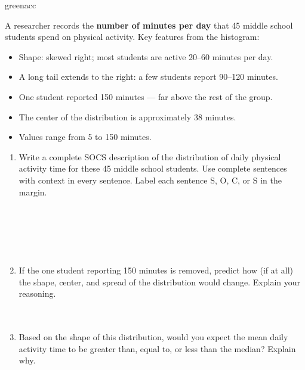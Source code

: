\documentclass[10pt]{article}
\begin{document}
\begin{blurbbox}{greenacc}
\small

A researcher records the \textbf{number of minutes per day} that 45 middle
school students spend on physical activity. Key features from the histogram:

\begin{itemize}[itemsep=3pt]
  \item Shape: skewed right; most students are active 20--60 minutes per day.
  \item A long tail extends to the right: a few students report 90--120 minutes.
  \item One student reported 150 minutes --- far above the rest of the group.
  \item The center of the distribution is approximately 38 minutes.
  \item Values range from 5 to 150 minutes.
\end{itemize}

\vspace{10pt}

\begin{enumerate}[leftmargin=1.5em, itemsep=10pt]

  \item Write a complete SOCS description of the distribution of daily physical
        activity time for these 45 middle school students. Use complete sentences
        with context in every sentence. Label each sentence S, O, C, or S in
        the margin.\\[6pt]
        \writeline\\[1pt]\writeline\\[1pt]\writeline\\[1pt]\writeline\\[1pt]
        \writeline\\[1pt]\writeline

  \item If the one student reporting 150 minutes is removed, predict how (if
        at all) the shape, center, and spread of the distribution would change.
        Explain your reasoning.\\[6pt]
        \writeline\\[1pt]\writeline\\[1pt]\writeline

  \item Based on the shape of this distribution, would you expect the mean
        daily activity time to be greater than, equal to, or less than the
        median? Explain why.\\[6pt]
        \writeline\\[1pt]\writeline\\[1pt]\writeline

\end{enumerate}

\end{blurbbox}
\end{document}
